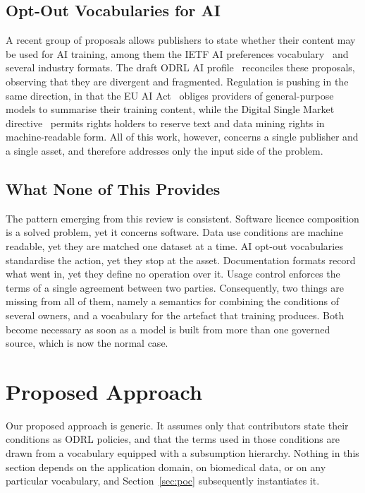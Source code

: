 \documentclass[sigconf,anonymous,review]{acmart}
\begin{document}
\subsection{Opt-Out Vocabularies for AI}

A recent group of proposals allows publishers to state whether their content may
be used for AI training, among them the IETF AI preferences
vocabulary~\cite{aipref} and several industry formats. The draft ODRL AI
profile~\cite{odrl-ai} reconciles these proposals, observing that they are
divergent and fragmented. Regulation is pushing in the same direction, in that
the EU AI Act~\cite{aiact} obliges providers of general-purpose models to
summarise their training content, while the Digital Single Market
directive~\cite{dsm} permits rights holders to reserve text and data mining
rights in machine-readable form. All of this work, however, concerns a single
publisher and a single asset, and therefore addresses only the input side of the
problem.

\subsection{What None of This Provides}

The pattern emerging from this review is consistent. Software licence composition
is a solved problem, yet it concerns software. Data use conditions are machine
readable, yet they are matched one dataset at a time. AI opt-out vocabularies
standardise the action, yet they stop at the asset. Documentation formats record
what went in, yet they define no operation over it. Usage control enforces the
terms of a single agreement between two parties. Consequently, two things are
missing from all of them, namely a semantics for combining the conditions of
several owners, and a vocabulary for the artefact that training produces. Both
become necessary as soon as a model is built from more than one governed source,
which is now the normal case.

\section{Proposed Approach}
\label{sec:approach}

Our proposed approach is generic. It assumes only that contributors state their
conditions as ODRL policies, and that the terms used in those conditions are
drawn from a vocabulary equipped with a subsumption hierarchy. Nothing in this
section depends on the application domain, on biomedical data, or on any
particular vocabulary, and Section~\ref{sec:poc} subsequently instantiates it.
\end{document}
